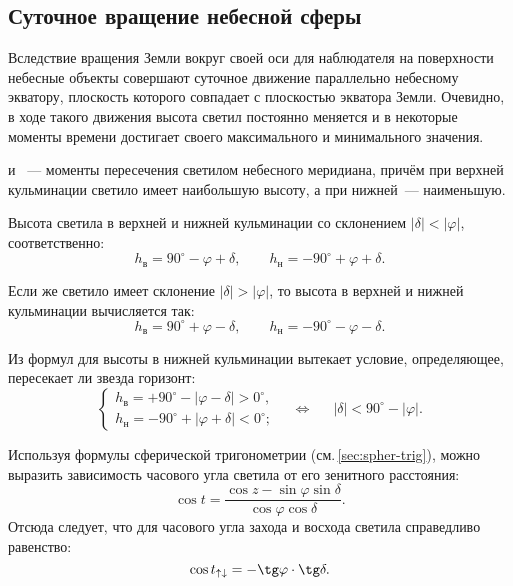 \subsection{Суточное вращение небесной сферы}
Вследствие вращения Земли вокруг своей оси для наблюдателя на поверхности небесные объекты совершают суточное движение параллельно небесному экватору, плоскость которого совпадает с плоскостью экватора Земли. Очевидно, в ходе такого движения высота светил постоянно меняется и в некоторые моменты времени достигает своего максимального и минимального значения.

 и ~--- моменты пересечения светилом небесного меридиана, причём при верхней кульминации светило имеет наибольшую высоту, а при нижней~--- наименьшую.

Высота светила в верхней и нижней кульминации со склонением $|\delta| < |\varphi|$, соответственно:
\begin{equation}
	h_{\text{в}}= 90^\circ - \varphi + \delta, \quad\quad
	h_{\text{н}}= - 90^\circ + \varphi  + \delta.
\end{equation}

Если же светило имеет склонение $|\delta| > |\varphi|$, то высота в верхней и нижней кульминации вычисляется так:
\begin{equation}
	h_{\text{в}}= 90^\circ + \varphi - \delta, \quad\quad
	h_{\text{н}}= - 90^\circ -\varphi - \delta.
\end{equation}

Из формул для высоты в нижней кульминации вытекает условие, определяющее, пересекает ли звезда горизонт:
\begin{equation}
	\begin{cases}
		h_\text{в} = +90^\circ - |\varphi - \delta| > 0^\circ,\\
		h_\text{н} = - 90^\circ + |\varphi + \delta| < 0^\circ;
	\end{cases}
	\quad \Longleftrightarrow \quad~~ |\delta|< 90^{\circ} - |\varphi|.
\end{equation}

Используя формулы сферической тригонометрии (см.\,\ref{sec:spher-trig}), можно выразить зависимость часового угла светила от его зенитного расстояния:
\begin{equation}
	\cos t=\frac{\cos z-\sin\varphi\sin\delta}{\cos\varphi\cos\delta}.
\end{equation}
Отсюда следует, что для часового угла захода и восхода светила справедливо равенство:
\begin{equation}
	\cos t_{\uparrow\downarrow}=-\tg\varphi\cdot\tg\delta.
\end{equation}

